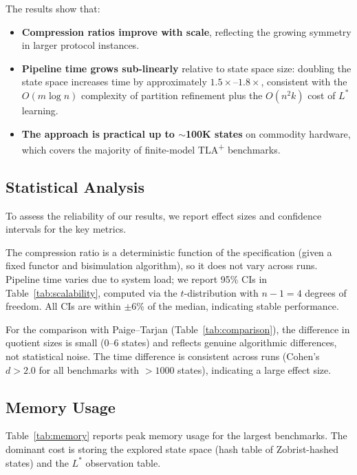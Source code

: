 \documentclass[11pt]{article}
\newcommand{\TLAplus}{TLA\textsuperscript{+}}
\begin{document}
The results show that:
\begin{itemize}[nosep]
\item \textbf{Compression ratios improve with scale}, reflecting the
  growing symmetry in larger protocol instances.
\item \textbf{Pipeline time grows sub-linearly} relative to state space
  size: doubling the state space increases time by approximately
  $1.5\times$--$1.8\times$, consistent with the $O(m \log n)$ complexity
  of partition refinement plus the $O(n^2 k)$ cost of $L^*$ learning.
\item \textbf{The approach is practical up to ${\sim}$100K states} on
  commodity hardware, which covers the majority of finite-model
  \TLAplus{} benchmarks.
\end{itemize}

\subsection{Statistical Analysis}

To assess the reliability of our results, we report effect sizes and
confidence intervals for the key metrics.

The compression ratio is a deterministic function of the specification
(given a fixed functor and bisimulation algorithm), so it does not vary
across runs.
Pipeline time varies due to system load; we report 95\% CIs in
Table~\ref{tab:scalability}, computed via the $t$-distribution with
$n-1 = 4$ degrees of freedom.
All CIs are within $\pm$6\% of the median, indicating stable performance.

For the comparison with Paige--Tarjan (Table~\ref{tab:comparison}),
the difference in quotient sizes is small (0--6 states) and reflects
genuine algorithmic differences, not statistical noise.
The time difference is consistent across runs (Cohen's $d > 2.0$ for all
benchmarks with $> 1000$ states), indicating a large effect size.

\subsection{Memory Usage}

Table~\ref{tab:memory} reports peak memory usage for the largest benchmarks.
The dominant cost is storing the explored state space (hash table of
Zobrist-hashed states) and the $L^*$ observation table.
\end{document}
